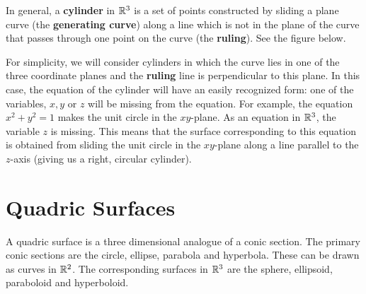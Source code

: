 \documentclass[handout]{ximera}
\begin{document}
In general, a {\bf cylinder} in $\mathbb R^3$ is a set of points constructed by sliding a plane curve (the {\bf generating curve}) along a line 
which is not in the plane of the curve that passes through one point on the curve (the {\bf ruling}). See the figure below.
\begin{image}
\end{image}




For simplicity, we will consider cylinders in which the curve lies in one of the three coordinate planes and the {\bf ruling} line is perpendicular to this plane.
In this case, the equation of the cylinder will have an easily recognized form: one of the variables, $x, y$ or $z$ will be missing from the equation.
For example, the equation $x^2+y^2 = 1$ makes the unit circle in the $xy$-plane.  As an equation in $\mathbb R^3$, the variable $z$ is missing.  
This means that the surface corresponding to this equation is obtained from sliding the unit 
circle in the $xy$-plane along a line parallel to the $z$-axis (giving us a right, circular cylinder).


\section{Quadric Surfaces}
A quadric surface is a three dimensional analogue of a conic section.
The primary conic sections are the circle, ellipse, parabola and hyperbola. These can be drawn as curves in $\mathbb R^2$.
The corresponding surfaces in $\mathbb R^3$ are the sphere, ellipsoid, paraboloid and hyperboloid. 

\end{document}
